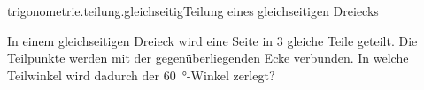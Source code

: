 \begin{exercise}{trigonometrie.teilung.gleichseitig}{Teilung eines gleichseitigen Dreiecks}
  \ifproblem\problem\par
    In einem gleichseitigen Dreieck wird eine Seite in 3 gleiche Teile geteilt.
    Die Teilpunkte werden mit der gegenüberliegenden Ecke verbunden. In welche
    Teilwinkel wird dadurch der \SI{60}{\degree}-Winkel zerlegt?
  \fi
\end{exercise}
